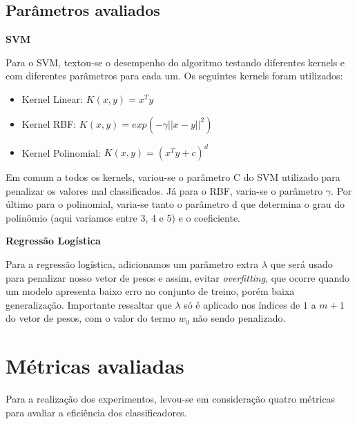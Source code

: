 \subsection{Parâmetros avaliados}

\textbf{SVM}

Para o SVM, textou-se o desempenho do algoritmo testando diferentes kernels e com diferentes
parâmetros para cada um. Os seguintes kernels foram utilizados:

\begin{itemize}
	\item Kernel Linear: $K(x, y) = x^Ty$
	\item Kernel RBF: $K(x, y) = exp(-\gamma||x - y||^2)$
	\item Kernel Polinomial: $K(x, y) = (x^Ty + c)^d$
\end{itemize}

Em comum a todos os kernels, variou-se o parâmetro C do SVM utilizado para penalizar os valores
mal classificados. Já para o RBF, varia-se o parâmetro $\gamma$. Por último para o polinomial,
varia-se tanto o parâmetro d que determina o grau do polinômio (aqui variamos entre 3, 4 e 5) e o coeficiente.

\textbf{Regressão Logística}

Para a regressão logística, adicionamos um parâmetro extra $\lambda$ que será usado para penalizar
nosso vetor de pesos e assim, evitar \textit{overfitting}, que ocorre quando um modelo apresenta
baixo erro no conjunto de treino, porém baixa generalização. 
Importante ressaltar que $\lambda$ só é aplicado nos índices
de $1$ a $m + 1$ do vetor de pesos, com o valor do termo $w_0$ não sendo penalizado.


\section{Métricas avaliadas}

Para a realização dos experimentos, levou-se em consideração quatro métricas
para avaliar a eficiência dos classificadores.

